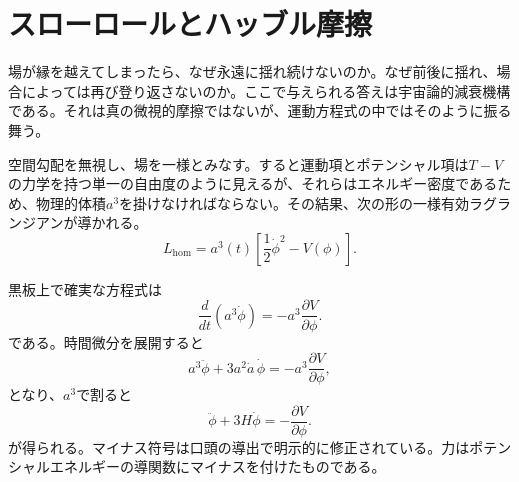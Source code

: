 \begin{classroomqa}
\end{classroomqa}

\begin{classroomqa}
\end{classroomqa}

\section{スローロールとハッブル摩擦}

場が縁を越えてしまったら、なぜ永遠に揺れ続けないのか。なぜ前後に揺れ、場合によっては再び登り返さないのか。ここで与えられる答えは宇宙論的減衰機構である。それは真の微視的摩擦ではないが、運動方程式の中ではそのように振る舞う。

空間勾配を無視し、場を一様とみなす。すると運動項とポテンシャル項は\(T-V\)の力学を持つ単一の自由度のように見えるが、それらはエネルギー密度であるため、物理的体積\(a^3\)を掛けなければならない。その結果、次の形の一様有効ラグランジアンが導かれる。
\begin{equation}
L_{\mathrm{hom}}=a^3(t)\left[\frac12\dot\phi^2-V(\phi)\right].
\end{equation}

黒板上で確実な方程式は
\begin{equation}
\frac{d}{dt}\left(a^3\dot\phi\right)=-a^3\frac{\partial V}{\partial\phi}.
\end{equation}
である。時間微分を展開すると
\begin{equation}
a^3\ddot\phi+3a^2\dot a\,\dot\phi=-a^3\frac{\partial V}{\partial\phi},
\end{equation}
となり、\(a^3\)で割ると
\begin{equation}
\ddot\phi+3H\dot\phi=-\frac{\partial V}{\partial\phi}.
\end{equation}
が得られる。マイナス符号は口頭の導出で明示的に修正されている。力はポテンシャルエネルギーの導関数にマイナスを付けたものである。

